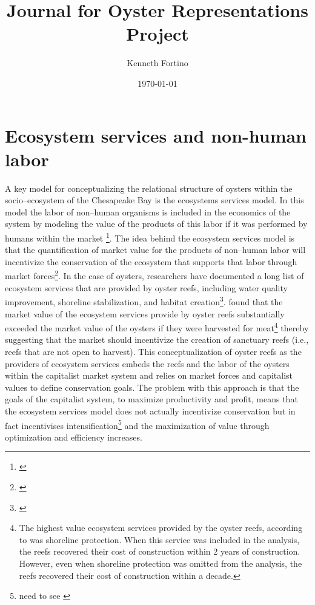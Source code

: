 \documentclass{article}
\begin{document}
\title{Journal for Oyster Representations Project}
\author{Kenneth Fortino}
\date{\today}

\maketitle

\section{Ecosystem services and non-human labor}

A key model for conceptualizing the relational structure of oysters within the socio--ecosystem of the Chesapeake Bay is the ecosystems services model. In this model the labor of non--human organisms is included in the economics of the system by modeling the value of the products of this labor if it was performed by humans within the market \footnote{\cite{costanza_value_1998}}. The idea behind the ecosystem services model is that the quantification of market value for the products of non--human labor will incentivize the conservation of the ecosystem that supports that labor  through market forces\footnote{\cite{costanza_value_1998}}. In the case of oysters, researchers have documented a long list of ecosystem services that are provided by oyster reefs, including water quality improvement, shoreline stabilization, and habitat creation\footnote{\cite{grabowski_economic_2012, coen_oyster_date}}. \citeauthor{grabowski_economic_2012} found that the market value of the ecosystem services provide by oyster reefs substantially exceeded the market value of the oysters if they were harvested for meat\footnote{The highest value ecosystem services  provided by the oyster reefs, according to \cite{grabowski_economic_2012} was shoreline protection. When this service was included in the analysis, the reefs recovered their cost of construction within 2 years of construction. However, even when shoreline protection was omitted from the analysis, the reefs recovered their cost of construction within a decade.} 
thereby suggesting that the market should incentivize the creation of sanctuary reefs (i.e., reefs that are not open to harvest). This conceptualization of oyster reefs as the providers of ecosystem services embeds the reefs and the labor of the oysters within the capitalist market system and relies on market forces and capitalist values to define conservation goals. The problem with this approach is that the goals of the capitalist system, to maximize productivity and profit, means that the ecosystem services model does not actually incentivize conservation but in fact incentivises intensification\footnote{need to see \cite{bommarco_ecological_2013}} and the maximization of value through optimization and efficiency increases. 
\end{document}
